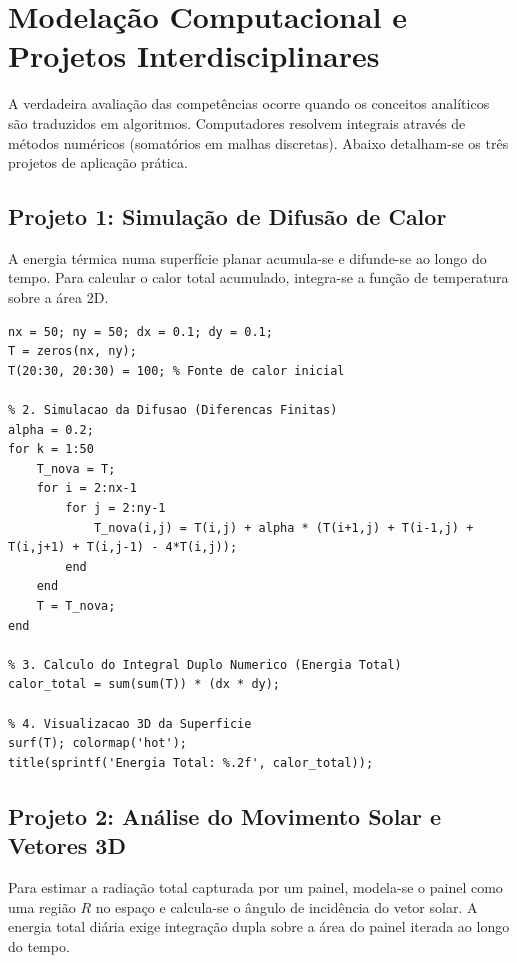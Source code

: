 \documentclass[12pt,a4paper]{article}
\begin{document}
\section{Modelação Computacional e Projetos Interdisciplinares}
A verdadeira avaliação das competências ocorre quando os conceitos analíticos são traduzidos em algoritmos. Computadores resolvem integrais através de métodos numéricos (somatórios em malhas discretas). Abaixo detalham-se os três projetos de aplicação prática.

\subsection{Projeto 1: Simulação de Difusão de Calor}
A energia térmica numa superfície planar acumula-se e difunde-se ao longo do tempo. Para calcular o calor total acumulado, integra-se a função de temperatura sobre a área 2D. 

\begin{lstlisting}[caption={Simulação de Difusão de Calor em MATLAB/Octave}]
% 1. Configuracao do Dominio (Regiao Planar R)
nx = 50; ny = 50; dx = 0.1; dy = 0.1; 
T = zeros(nx, ny); 
T(20:30, 20:30) = 100; % Fonte de calor inicial

% 2. Simulacao da Difusao (Diferencas Finitas)
alpha = 0.2; 
for k = 1:50
    T_nova = T;
    for i = 2:nx-1
        for j = 2:ny-1
            T_nova(i,j) = T(i,j) + alpha * (T(i+1,j) + T(i-1,j) + T(i,j+1) + T(i,j-1) - 4*T(i,j));
        end
    end
    T = T_nova;
end

% 3. Calculo do Integral Duplo Numerico (Energia Total)
calor_total = sum(sum(T)) * (dx * dy);

% 4. Visualizacao 3D da Superficie
surf(T); colormap('hot');
title(sprintf('Energia Total: %.2f', calor_total));
\end{lstlisting}

\subsection{Projeto 2: Análise do Movimento Solar e Vetores 3D}
Para estimar a radiação total capturada por um painel, modela-se o painel como uma região $R$ no espaço e calcula-se o ângulo de incidência do vetor solar. A energia total diária exige integração dupla sobre a área do painel iterada ao longo do tempo.
\end{document}
